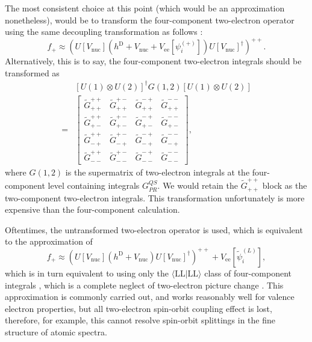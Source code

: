 \documentclass{article}
\begin{document}
The most consistent choice at this point (which would be an approximation nonetheless), would be to transform the four-component two-electron operator using the same decoupling transformation as follows \cite[eq. 14.57]{reiherRelativisticQuantumChemistry2014}:
\begin{equation}
    f_+\approx \left( U[V_{\mathrm{nuc}}](h^{\mathrm{D}}+V_{\mathrm{nuc}}+V_{\mathrm{ee}}[\psi_i^{(+)}])U[V_{\mathrm{nuc}}]^{\dagger} \right)^{++}.
\end{equation}
Alternatively, this is to say, the four-component two-electron integrals should be transformed as \cite{sikkemaMolecularMeanfieldApproach2009,saueRelativisticHamiltoniansChemistry2011}
\begin{align}
    &[U(1)\otimes U(2)]^{\dagger}G(1,2)[U(1)\otimes U(2)]\\
    =&\begin{bmatrix}
        \tilde{G}^{++}_{++} & \tilde{G}^{+-}_{++} & \tilde{G}^{-+}_{++} & \tilde{G}^{--}_{++}\\
        \tilde{G}^{++}_{+-} & \tilde{G}^{+-}_{+-} & \tilde{G}^{-+}_{+-} & \tilde{G}^{--}_{+-}\\
        \tilde{G}^{++}_{-+} & \tilde{G}^{+-}_{-+} & \tilde{G}^{-+}_{-+} & \tilde{G}^{--}_{-+}\\
        \tilde{G}^{++}_{--} & \tilde{G}^{+-}_{--} & \tilde{G}^{-+}_{--} & \tilde{G}^{--}_{--}
    \end{bmatrix},
\end{align}
where $G(1,2)$ is the supermatrix of two-electron integrals at the four-component level containing integrals $G^{QS}_{PR}$. We would retain the $\tilde{G}^{++}_{++}$ block as the two-component two-electron integrals. This transformation unfortunately is more expensive than the four-component calculation. 

Oftentimes, the untransformed two-electron operator is used, which is equivalent to the approximation of
\begin{equation}
    f_+\approx \left( U[V_{\mathrm{nuc}}](h^{\mathrm{D}}+V_{\mathrm{nuc}})U[V_{\mathrm{nuc}}]^{\dagger} \right)^{++}
    +V_{\mathrm{ee}}[\tilde{\psi}_i^{(L)}],
\end{equation}
which is in turn equivalent to using only the $\langle \mathrm{LL}|\mathrm{LL}\rangle$ class of four-component integrals \cite[eq. 28]{sikkemaMolecularMeanfieldApproach2009}, which is a complete neglect of two-electron picture change \cite{sikkemaMolecularMeanfieldApproach2009}. This approximation is commonly carried out, and works reasonably well for valence electron properties, but all two-electron spin-orbit coupling effect is lost, therefore, for example, this cannot resolve spin-orbit splittings in the fine structure of atomic spectra.
\end{document}
